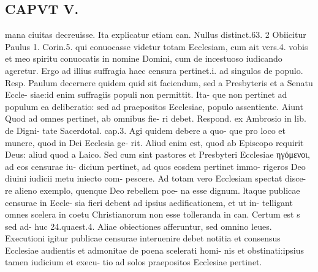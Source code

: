 \documentclass{article}
\begin{document}
\begin{pages}
\section*{CAPVT  V. }
\marginpar{[ p.247 ]}mana ciuitas decreuisse. Ita explicatur etiam can. Nullus distinct.63. 2 Obiicitur Paulus 1. Corin.5. qui conuocasse videtur totam Ecclesiam, cum ait vers.4. vobis et meo spiritu conuocatis in nomine Domini, cum de incestuoso iudicando ageretur. Ergo ad illius suffragia haec censura pertinet.i. ad singulos de populo. Resp. Paulum decernere quidem quid sit faciendum, sed a Presbyteris et a Senatu Eccle- siae:id enim suffragiis populi non permittit. Ita- que non pertinet ad populum ea deliberatio: sed ad praepositos Ecclesiae, populo assentiente. Aiunt Quod ad omnes pertinet, ab omnibus fie- ri debet. Respond. ex Ambrosio in lib. de Digni- tate Sacerdotal. cap.3. Agi quidem debere a quo- que pro loco et munere, quod in Dei Ecclesia ge- rit. Aliud enim est, quod ab Episcopo requirit Deus: aliud quod a Laico. Sed cum sint pastores et Presbyteri Ecclesiae ηγόμενοι, ad eos censurae iu- dicium pertinet, ad quos eosdem pertinet immo- rigeros Deo diuini iudicii metu iniecto com- pescere. Ad totam vero Ecclesiam spectat disce- re alieno exemplo, quenque Deo rebellem poe- na esse dignum. ltaque publicae censurae in Eccle- sia fieri debent ad ipsius aedificationem, et ut in- telligant omnes scelera in coetu Christianorum non esse tolleranda in can. Certum est s sed ad- huc 24.quaest.4. Aliae obiectiones afferuntur, sed omnino leues. Executioni igitur publicae censurae interuenire debet notitia et consensus Ecclesiae audientis et admonitae de poena scelerati homi- nis et obstinati:ipsius tamen iudicium et execu- tio ad solos praepositos Ecclesiae pertinet. 

\end{pages}
\end{document}

